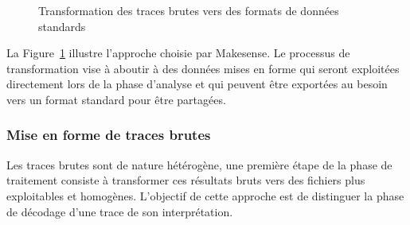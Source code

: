 \begin{figure}[ht]
\centering
{}
\caption{Transformation des traces brutes vers des formats de données standards}
\label{makesense:fig:data_clean}
\end{figure}

La Figure~\ref{makesense:fig:data_clean} illustre l'approche choisie par Makesense.
Le processus de transformation vise à aboutir à des données mises en forme qui seront exploitées directement lors de la phase d'analyse et qui peuvent être exportées au besoin vers un format standard pour être partagées.

\subsubsection{Mise en forme de traces brutes}

Les traces brutes sont de nature hétérogène, une première étape de la phase de traitement consiste à transformer ces résultats bruts vers des fichiers plus exploitables et homogènes.
L'objectif de cette approche est de distinguer la phase de décodage d'une trace de son interprétation.

